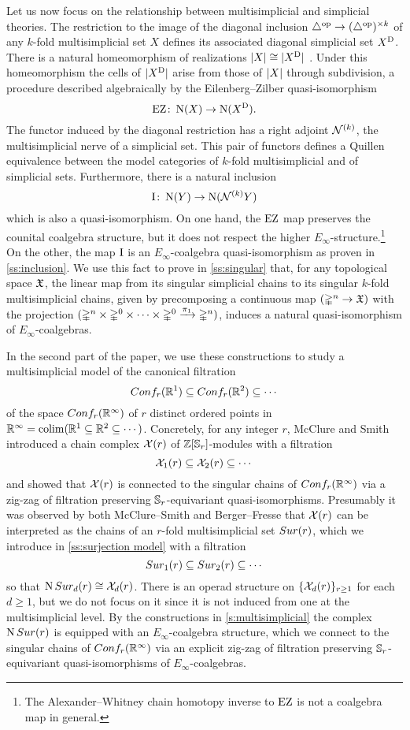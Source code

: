 Let us now focus on the relationship between multisimplicial and simplicial theories.
The restriction to the image of the diagonal inclusion $\triangle^{\mathrm{op}} \to (\triangle^{\mathrm{op}})^{\times k}$ of any $k$-fold multisimplicial set $X$ defines its associated diagonal simplicial set $X^{\mathrm{D}}$.
There is a natural homeomorphism of realizations $\lvert X\rvert \cong \lvert X^{\mathrm{D}}\rvert$
\cite{quillen2010higheralgktheory}.
Under this homeomorphism the cells of $\lvert X^{\mathrm{D}}\rvert$ arise from those of $\lvert X\rvert$ through subdivision, a procedure described algebraically by the Eilenberg--Zilber quasi-isomorphism
\[
\operatorname{EZ} \colon \operatorname{N}(X) \to \operatorname{N}(X^{\mathrm{D}}).
\]
The functor induced by the diagonal restriction has a right adjoint $\mathcal{N}^{(k)}$, the multisimplicial nerve of a simplicial set. This pair of functors defines a Quillen equivalence between the model categories of $k$-fold multisimplicial and of simplicial sets.
Furthermore, there is a natural inclusion
\[
\operatorname{I} \colon \operatorname{N}(Y) \to \operatorname{N}(\mathcal{N}^{(k)} Y)
\]
which is also a quasi-isomorphism.
On one hand, the $\operatorname{EZ}$ map preserves the counital coalgebra structure, but it does not respect the higher $E_\infty$-structure.\footnote{The Alexander--Whitney chain homotopy inverse to $\operatorname{EZ}$ is not a coalgebra map in general.}
On the other, the map $\operatorname{I}$ is an $E_\infty$-coalgebra quasi-isomorphism as proven in \cref{ss:inclusion}.
We use this fact to prove in \cref{ss:singular} that, for any topological space $\mathfrak{X}$, the linear map from its singular simplicial chains to its singular $k$-fold multisimplicial chains, given by precomposing a continuous map $(\mathbb{\Delta}^n \to \mathfrak{X})$ with the projection $(\mathbb{\Delta}^n \times \mathbb{\Delta}^{0}\times\dots\times\mathbb{\Delta}^{0} \xrightarrow{\pi_1} \mathbb{\Delta}^n)$, induces a natural quasi-isomorphism of $E_\infty$-coalgebras.

In the second part of the paper, we use these constructions to study a multisimplicial model of the canonical filtration
\[
Conf_{r}(\mathbb{R}^{1}) \subseteq Conf_{r}(\mathbb{R}^{2}) \subseteq \dotsb
\]
of the space $Conf_{r}(\mathbb{R}^{\infty})$ of $r$ distinct ordered points in $\mathbb{R}^\infty = \operatorname*{colim} (\mathbb{R}^1 \subseteq \mathbb{R}^2 \subseteq \dotsb)$.
Concretely, for any integer $r$, McClure and Smith \cite{mcclure2003multivariable} introduced a chain complex $\mathcal{X}(r)$ of $\mathbb{Z}[\mathbb{S}_r]$-modules with a filtration
\[
\mathcal{X}_{1}(r) \subseteq \mathcal{X}_{2}(r) \subseteq \dotsb
\]
and showed that $\mathcal{X}(r)$ is connected to the singular chains of $Conf_{r}(\mathbb{R}^{\infty})$ via a zig-zag of filtration preserving $\mathbb{S}_r$-equivariant quasi-isomorphisms.
Presumably it was observed by both McClure--Smith and Berger--Fresse that $\mathcal{X}(r)$ can be interpreted as the chains of an $r$-fold multisimplicial set $Sur(r)$, which we introduce in \cref{ss:surjection model} with a filtration
\[
Sur_{1}(r) \subseteq Sur_{2}(r) \subseteq \dotsb
\]
so that $\operatorname{N}Sur_{d}(r) \cong \mathcal{X}_{d}(r)$.
There is an operad structure on $\{\mathcal{X}_{d}(r)\}_{r \geq 1}$ for each $d \geq 1$, but we do not focus on it since it is not induced from one at the multisimplicial level.
By the constructions in \cref{s:multisimplicial} the complex $\operatorname{N}Sur(r)$ is equipped with an $E_\infty$-coalgebra structure, which we connect to the singular chains of $Conf_{r}(\mathbb{R}^{\infty})$ via an explicit zig-zag of filtration preserving $\mathbb{S}_r$-equivariant quasi-isomorphisms of $E_\infty$-coalgebras.

